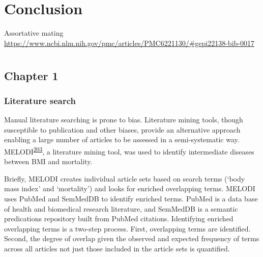 \documentclass[11pt,twoside]{bristolthesis}
\begin{document}
\hypertarget{conclusion}{%
\chapter*{Conclusion}\label{conclusion}}

Assortative mating
\url{https://www.ncbi.nlm.nih.gov/pmc/articles/PMC6221130/\#gepi22138-bib-0017}

\appendix

\hypertarget{section}{%
\chapter{}\label{section}}

\newpage

\hypertarget{chapter1-appendix}{%
\section{Chapter 1}\label{chapter1-appendix}}

\hypertarget{literature-search}{%
\subsection{Literature search}\label{literature-search}}

Manual literature searching is prone to bias. Literature mining tools, though susceptible to publication and other biases, provide an alternative approach enabling a large number of articles to be assessed in a semi-systematic way. MELODI\textsuperscript{\protect\hyperlink{ref-Elsworth2018}{203}}, a literature mining tool, was used to identify intermediate diseases between BMI and mortality.

Briefly, MELODI creates individual article sets based on search terms (`body mass index' and `mortality') and looks for enriched overlapping terms. MELODI uses PubMed and SemMedDB to identify enriched terms. PubMed is a data base of health and biomedical research literature, and SemMedDB is a semantic predications repository built from PubMed citations. Identifying enriched overlapping terms is a two-step process. First, overlapping terms are identified. Second, the degree of overlap given the observed and expected frequency of terms across all articles not just those included in the article sets is quantified.
\end{document}
